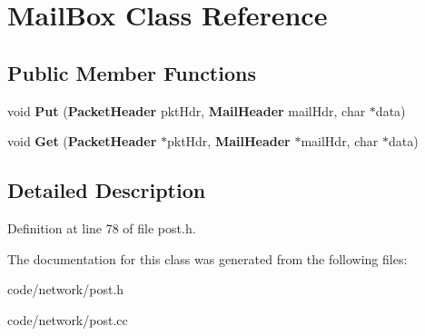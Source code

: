 \section{Mail\+Box Class Reference}
\label{class_mail_box}
\subsection*{Public Member Functions}
\begin{DoxyCompactItemize}
\item 
void {\bfseries Put} ({\bf Packet\+Header} pkt\+Hdr, {\bf Mail\+Header} mail\+Hdr, char $\ast$data)\label{class_mail_box_ad3c3f85a2bc7e49081e7d8b793b1ef6f}

\item 
void {\bfseries Get} ({\bf Packet\+Header} $\ast$pkt\+Hdr, {\bf Mail\+Header} $\ast$mail\+Hdr, char $\ast$data)\label{class_mail_box_a4eda4fa3299b15d8c0cf23d620676524}

\end{DoxyCompactItemize}


\subsection{Detailed Description}


Definition at line 78 of file post.\+h.



The documentation for this class was generated from the following files\+:\begin{DoxyCompactItemize}
\item 
code/network/post.\+h\item 
code/network/post.\+cc\end{DoxyCompactItemize}
